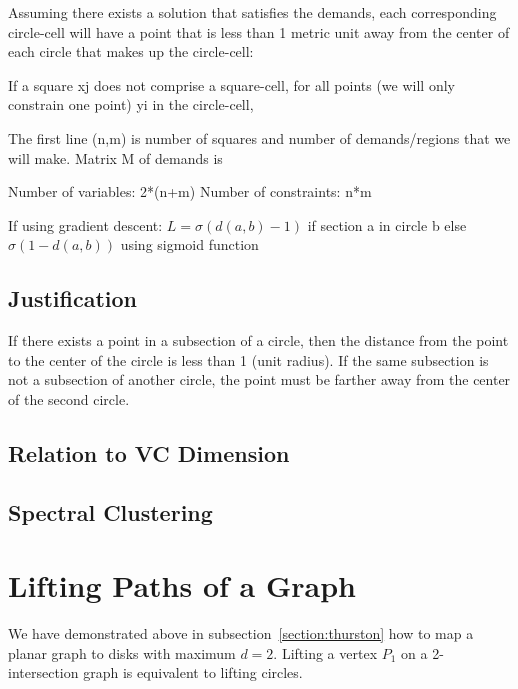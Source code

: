 \documentclass{NSF}
\begin{document}
\begin{figure}[ht]
\caption{
}
\label{fig:convex-opt}
\end{figure}

Assuming there exists a solution that satisfies the demands, each corresponding circle-cell will have a point that is less than 1 metric unit away from the center of each circle that makes up the circle-cell:

If a square xj does not comprise a square-cell, for all points (we will only constrain one point) yi in the circle-cell,


The first line (n,m) is number of squares and number of demands/regions that we will make.
Matrix M of demands is 


Number of variables: 2*(n+m)
Number of constraints: n*m

If using gradient descent: $L = \sigma(d(a,b)-1)$ if section a in circle b else $\sigma(1-d(a,b))$ using sigmoid function


\subsection{Justification}
If there exists a point in a subsection of a circle, then the distance from the point to the center of the circle is less than 1 (unit radius). If the same subsection is not a subsection of another circle, the point must be farther away from the center of the second circle.

\subsection{Relation to VC Dimension}

\subsection{Spectral Clustering}

\section{Lifting Paths of a Graph}
We have demonstrated above in subsection~\ref{section:thurston} how to map a planar graph to disks with maximum $d=2$. Lifting a vertex $P_1$ on a 2-intersection graph is  equivalent to lifting circles.
\end{document}

